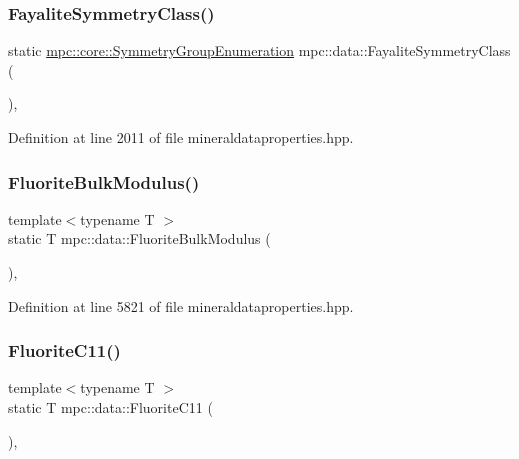 \subsubsection{\texorpdfstring{Fayalite\+Symmetry\+Class()}{FayaliteSymmetryClass()}}
{\footnotesize\ttfamily static \mbox{\hyperlink{namespacempc_1_1core_a9d979684062547055a0ef5c13077bad8}{mpc\+::core\+::\+Symmetry\+Group\+Enumeration}} mpc\+::data\+::\+Fayalite\+Symmetry\+Class (\begin{DoxyParamCaption}{ }\end{DoxyParamCaption})\hspace{0.3cm}{\ttfamily [inline]}, {\ttfamily [static]}}



Definition at line 2011 of file mineraldataproperties.\+hpp.

\mbox{\label{namespacempc_1_1data_a300bdda2f3bc514ca3eceb4784c7c5a8}} 
\subsubsection{\texorpdfstring{Fluorite\+Bulk\+Modulus()}{FluoriteBulkModulus()}}
{\footnotesize\ttfamily template$<$typename T $>$ \\
static T mpc\+::data\+::\+Fluorite\+Bulk\+Modulus (\begin{DoxyParamCaption}{ }\end{DoxyParamCaption})\hspace{0.3cm}{\ttfamily [inline]}, {\ttfamily [static]}}



Definition at line 5821 of file mineraldataproperties.\+hpp.

\mbox{\label{namespacempc_1_1data_ad5d990ae2df77ff3c99ce8f13bea2ae7}} 
\subsubsection{\texorpdfstring{Fluorite\+C11()}{FluoriteC11()}}
{\footnotesize\ttfamily template$<$typename T $>$ \\
static T mpc\+::data\+::\+Fluorite\+C11 (\begin{DoxyParamCaption}{ }\end{DoxyParamCaption})\hspace{0.3cm}{\ttfamily [inline]}, {\ttfamily [static]}}



